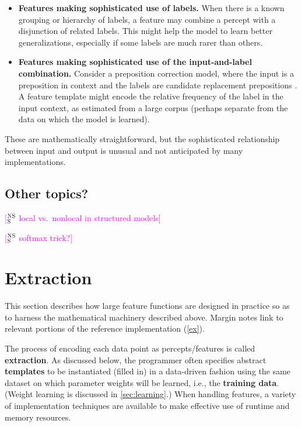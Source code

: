 \documentclass[11pt,letterpaper]{article}
\newcommand{\ensuretext}[1]{#1}
\newcommand{\nssmarker}{\ensuretext{\textcolor{magenta}{\ensuremath{^{\textsc{NS}}_{\textsc{S}}}}}}
\newcommand{\arkcomment}[3]{\ensuretext{\textcolor{#3}{[#1 #2]}}}
\newcommand{\nss}[1]{\arkcomment{\nssmarker}{#1}{magenta}}
\begin{document}
\begin{itemize}
\item \textbf{Features making sophisticated use of labels.} 
When there is a known grouping or hierarchy of labels, a feature may combine a percept 
with a disjunction of related labels. This might help the model to learn better generalizations, 
especially if some labels are much rarer than others.

\item \textbf{Features making sophisticated use of the input-and-label combination.}
Consider a preposition correction model, where the input is a preposition in context 
and the labels are candidate replacement prepositions \citep[as in][]{han-10}. 
A feature template might encode the relative frequency of the label in the input context, 
as estimated from a large corpus (perhaps separate from the data on which the model is learned).
\end{itemize}

These are mathematically straightforward, but the sophisticated relationship between input and output 
is unusual and not anticipated by many implementations.

\subsection{Other topics?}

\nss{local vs.~nonlocal in structured models}

\nss{softmax trick?}

\section{Extraction}\label{sec:extraction}

This section describes how large feature functions are designed in practice
so as to harness the mathematical machinery described above.
Margin notes link to relevant portions of the reference implementation (\cref{ex}).

The process of encoding 
each data point as percepts\slash features is called \textbf{extraction}.
As discussed below, the programmer often specifies abstract \textbf{templates} 
to be instantiated (filled in) in a data-driven fashion
using the same dataset on which parameter weights will be learned, 
i.e., the \textbf{training data}. (Weight learning is discussed in \cref{sec:learning}.)
When handling features, a variety of implementation techniques 
are available to make effective use of runtime and memory resources.
\end{document}
